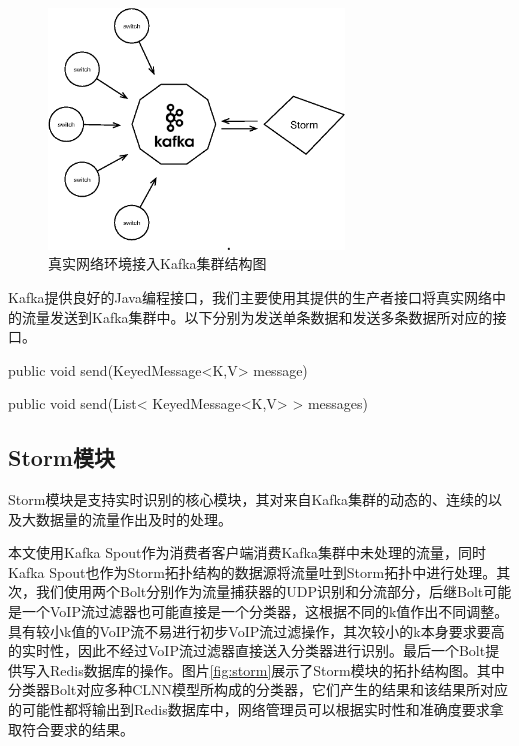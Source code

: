 \begin{figure}[htp]
\begin{center}
\includegraphics[width=0.7\textwidth]{figures/kafka.eps}
\caption{真实网络环境接入Kafka集群结构图}\label{fig:kafka}
\end{center}
\end{figure}

Kafka提供良好的Java编程接口，我们主要使用其提供的生产者接口将真实网络中的流量发送到Kafka集群中。以下分别为发送单条数据和发送多条数据所对应的接口。

\begin{center}
\monaco
public void send(KeyedMessage<K,V> message) 
\end{center}

\begin{center}
\monaco
public void send(List< KeyedMessage<K,V> > messages) 
\end{center}

\subsection{Storm模块}
Storm模块是支持实时识别的核心模块，其对来自Kafka集群的动态的、连续的以及大数据量的流量作出及时的处理。

本文使用Kafka Spout作为消费者客户端消费Kafka集群中未处理的流量，同时Kafka Spout也作为Storm拓扑结构的数据源将流量吐到Storm拓扑中进行处理。其次，我们使用两个Bolt分别作为流量捕获器的UDP识别和分流部分，后继Bolt可能是一个VoIP流过滤器也可能直接是一个分类器，这根据不同的k值作出不同调整。具有较小k值的VoIP流不易进行初步VoIP流过滤操作，其次较小的k本身要求要高的实时性，因此不经过VoIP流过滤器直接送入分类器进行识别。最后一个Bolt提供写入Redis数据库的操作。图片\ref{fig:storm}展示了Storm模块的拓扑结构图。其中分类器Bolt对应多种CLNN模型所构成的分类器，它们产生的结果和该结果所对应的可能性都将输出到Redis数据库中，网络管理员可以根据实时性和准确度要求拿取符合要求的结果。

